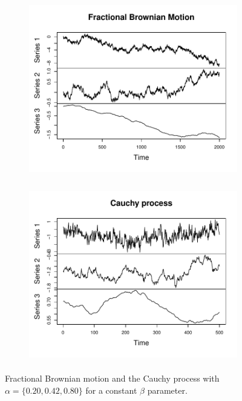 \begin{figure}[!htbp]
  \begin{subfigure}[b]{0.49\textwidth}
\includegraphics[width = 0.9\linewidth, height = 3in]{./figs/fBm-coeffs-plot.pdf}
  \end{subfigure}
  \hfill
  \begin{subfigure}[b]{0.49\textwidth}
  \includegraphics[width = 0.9\linewidth, height = 3in]{./figs/cauchy-plot.pdf}
    
  \end{subfigure}
  
  \caption{Fractional Brownian motion and the Cauchy process with $\alpha = \{ 0.20, 0.42, 0.80 \}$ for a constant $\beta$ parameter.}
\end{figure}

